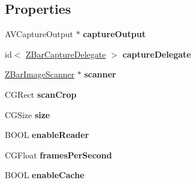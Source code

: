 \subsection*{Properties}
\begin{DoxyCompactItemize}
\item 
\hypertarget{interface_z_bar_capture_reader_ac09b39c4cb1acbff24234ac712eb08a1}{
AVCaptureOutput $\ast$ {\bfseries captureOutput}}
\label{interface_z_bar_capture_reader_ac09b39c4cb1acbff24234ac712eb08a1}

\item 
\hypertarget{interface_z_bar_capture_reader_aa754dde76b6e884efddc12d90e52d5f1}{
id$<$ \hyperlink{protocol_z_bar_capture_delegate-p}{ZBarCaptureDelegate} $>$ {\bfseries captureDelegate}}
\label{interface_z_bar_capture_reader_aa754dde76b6e884efddc12d90e52d5f1}

\item 
\hypertarget{interface_z_bar_capture_reader_a2516c42be25daecca5a6ea927a7a68dd}{
\hyperlink{interface_z_bar_image_scanner}{ZBarImageScanner} $\ast$ {\bfseries scanner}}
\label{interface_z_bar_capture_reader_a2516c42be25daecca5a6ea927a7a68dd}

\item 
\hypertarget{interface_z_bar_capture_reader_a8c4b4a50caaac8c0e9328a3dab77b305}{
CGRect {\bfseries scanCrop}}
\label{interface_z_bar_capture_reader_a8c4b4a50caaac8c0e9328a3dab77b305}

\item 
\hypertarget{interface_z_bar_capture_reader_a23f901b976413803fa50ae142904bf95}{
CGSize {\bfseries size}}
\label{interface_z_bar_capture_reader_a23f901b976413803fa50ae142904bf95}

\item 
\hypertarget{interface_z_bar_capture_reader_a648fe5e1a7c4271b91149da4e1bcb0f6}{
BOOL {\bfseries enableReader}}
\label{interface_z_bar_capture_reader_a648fe5e1a7c4271b91149da4e1bcb0f6}

\item 
\hypertarget{interface_z_bar_capture_reader_a9192c9e29ea5f680086c229568f92be0}{
CGFloat {\bfseries framesPerSecond}}
\label{interface_z_bar_capture_reader_a9192c9e29ea5f680086c229568f92be0}

\item 
\hypertarget{interface_z_bar_capture_reader_afeab9b196b378da8edd76bd7d6dddfee}{
BOOL {\bfseries enableCache}}
\label{interface_z_bar_capture_reader_afeab9b196b378da8edd76bd7d6dddfee}

\end{DoxyCompactItemize}


